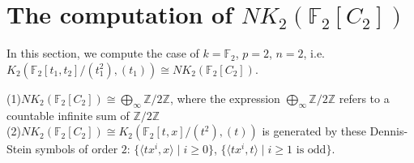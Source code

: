 \section{The computation of $NK_2(\mathbb{F}_2[C_2])$} %
In this section, we compute the case of $k=\mathbb{F}_2$, $p=2$, $n=2$, i.e.\ $K_2(\mathbb{F}_2[t_1,t_2]/(t_1^2),(t_1))\cong NK_2(\mathbb{F}_2[C_2])$.
\begin{theorem}
	(1)$NK_2(\mathbb{F}_2[C_2])\cong \bigoplus_{\infty} \mathbb{Z}/2 \mathbb{Z}$, where the expression $\bigoplus_{\infty} \mathbb{Z}/2 \mathbb{Z}$ refers to a countable infinite sum of $\mathbb{Z}/2 \mathbb{Z}$ \\
	(2)$NK_2(\mathbb{F}_2[C_2])\cong K_2(\mathbb{F}_2[t,x]/(t^2),(t))$ is generated by these Dennis-Stein symbols of order $2$: $\{\langle tx^i,x \rangle \mid i\geq 0\}$, $\{\langle tx^i,t \rangle \mid i\geq 1\text{ is odd}\}$. 
\end{theorem}
